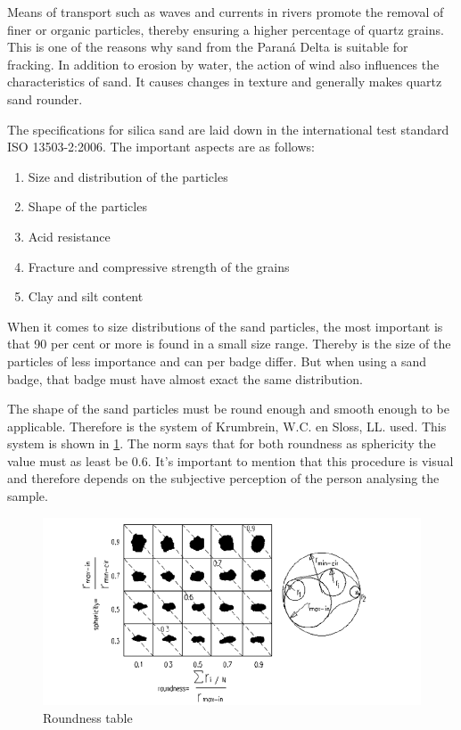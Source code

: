 Means of transport such as waves and currents in rivers promote the removal of finer or organic particles, thereby ensuring a higher percentage of quartz grains. This is one of the reasons why sand from the Paraná Delta is suitable for fracking.
In addition to erosion by water, the action of wind also influences the characteristics of sand. It causes changes in texture and generally makes quartz sand rounder. 

The specifications for silica sand are laid down in the international test standard ISO 13503-2:2006. The important aspects are as follows:

\begin{enumerate}
    \item  Size and distribution of the particles
    \item Shape of the particles
    \item Acid resistance 
    \item Fracture and compressive strength of the grains
    \item Clay and silt content
\end{enumerate}

When it comes to size distributions of the sand particles, the most important is that 90 per cent or more is found in a small size range. Thereby is the size of the particles of less importance and can per badge differ. But when using a sand badge, that badge must have almost exact the same distribution. 

The shape of the sand particles must be round enough and smooth enough to be applicable. Therefore is the system of Krumbrein, W.C. en Sloss, LL. used. This system is shown in \ref{fig:RT}. The norm says that for both roundness as sphericity the value must as least be 0.6. It's important to mention that this procedure is visual and therefore depends on the subjective perception of the person analysing the sample.

\begin{figure}[H]
    \centering
    \includegraphics[width=0.75\linewidth]{figures//ch9/roundness.png}
    \caption{Roundness table \autocite{rodriguezParticleShapeQuantities2013}}
    \label{fig:RT}
\end{figure}

